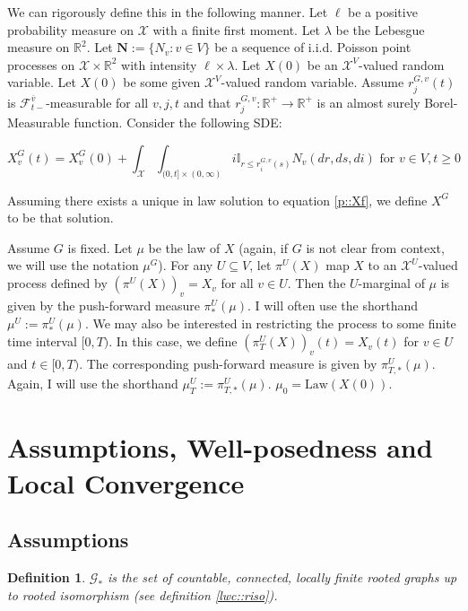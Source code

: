 \documentclass[12pt]{article}
\newcommand{\mb}{\mathbb}
\newcommand{\mc}{\mathcal}
\newcommand{\ra}{\rightarrow}
\newcommand{\ov}{\overline}
\newcommand{\te}{\text}
\newcommand{\ind}{\hspace{24pt}}
\newcommand{\defeq}{:=}								%
\newcommand{\sta}{\mc{X}}							%
\newcommand{\cl}[1]{\ov{#1}}						%
\newcommand{\Xf}{X}									%
\newcommand{\poiss}{N}								%
\newcommand{\leb}{\lambda}							%
\newcommand{\Sm}{\ell}								%
\newcommand{\rate}{r}								%
\newcommand{\F}{\mc{F}}								%
\newcommand{\m}{\mu}								%
\newcommand{\proj}{\pi}								%
\newcommand{\poisses}{\mathbf{N}}					%
\newcommand{\poissv}[1]{_{#1}}						%
\newcommand{\vind}[1]{_{#1}}						%
\newcommand{\tme}[1]{(#1)}							%
\newcommand{\gind}[1]{^{#1}}						%
\newcommand{\vpara}[1]{^{#1}}						%
\newcommand{\stpara}[1]{_{#1}}						%
\newcommand{\tpara}[1]{_{#1}}						%
\newcommand{\gvpara}[2]{^{#1,#2}}					%
\newcommand{\psf}{_*}								%
\newcommand{\tparapsf}[1]{_{#1,*}}					%
\newcommand{\Gs}{\mc{G}_\ast}						%
\newcommand{\law}{\te{Law}}							%
\newtheorem{defn}[thms]{Definition}
\begin{document}
\ind We can rigorously define this in the following manner. Let \(\Sm\) be a positive probability measure on \(\sta\) with a finite first moment. Let \(\leb\) be the Lebesgue measure on \(\mb{R}^2\). Let \(\poisses \defeq \{\poiss\poissv{v}:v \in V\}\) be a sequence of i.i.d. Poisson point processes on \(\sta\times \mb{R}^2\) with intensity \(\Sm\times \leb\). Let \(\Xf\tme{0}\) be an \(\sta^V\)-valued random variable. Let \(\Xf\tme{0}\) be some given \(\sta^V\)-valued random variable. Assume \(\rate\gvpara{G}{v}\stpara{j}(t)\) is \(\F\vpara{\cl{v}}\tpara{t-}\)-measurable for all \(v,j,t\) and that \(\rate\gvpara{G}{v}\stpara{j}:\mb{R}^+ \ra\mb{R}^+\) is an almost surely Borel-Measurable function. Consider the following SDE:

\begin{equation}
\Xf\gind{G}\vind{v}\tme{t} = \Xf\gind{G}\vind{v}\tme{0} + \int_{\sta}\int_{(0,t]\times (0,\infty)} i\mb{I}_{r \leq \rate\gvpara{G}{v}\stpara{i}(s)} \poiss\poissv{v}\left(dr,ds,di\right) \te{ for } v\in V, t \geq 0
\label{p::Xf}
\end{equation}

Assuming there exists a unique in law solution to equation \eqref{p::Xf}, we define \(\Xf\gind{G}\) to be that solution. 

\ind Assume \(G\) is fixed. Let \(\m\) be the law of \(\Xf\) (again, if \(G\) is not clear from context, we will use the notation \(\m\gind{G}\)). For any \(U \subseteq V\), let \(\proj\vpara{U}(\Xf)\) map \(\Xf\) to an \(\sta^U\)-valued process defined by \((\proj\vpara{U}(\Xf))\vind{v} = \Xf\vind{v}\) for all \(v\in U\). Then the \(U\)-marginal of \(\m\) is given by the push-forward measure \(\proj\vpara{U}\psf(\m)\). I will often use the shorthand \(\m\vpara{U} \defeq \proj\psf\vpara{U}(\m)\). We may also be interested in restricting the process to some finite time interval \([0,T)\). In this case, we define \((\proj\vpara{U}\tpara{T}(\Xf))\vind{v}\tme{t} = \Xf\vind{v}\tme{t}\) for \(v \in U\) and \(t \in [0,T)\). The corresponding push-forward measure is given by \(\proj\vpara{U}\tparapsf{T}(\m)\). Again, I will use the shorthand \(\m\vpara{U}\tpara{T} \defeq \proj\vpara{U}\tparapsf{T}(\m)\). \(\m\tpara{0} = \law(\Xf\tme{0})\).

\section{Assumptions, Well-posedness and Local Convergence}
\label{awl}
\subsection{Assumptions}
\label{awl::a}
\begin{defn}
\(\Gs\) is the set of countable, connected, locally finite rooted graphs up to rooted isomorphism (see definition \ref{lwc::riso}).
\label{a::gstar}
\end{defn}
\end{document}
